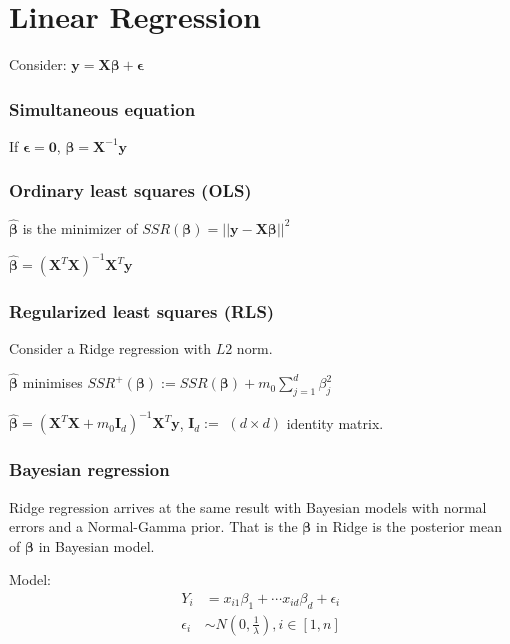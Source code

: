   \section{Linear Regression}

  Consider: $\mathbf{y} = \mathbf{X\beta} + \mathbf{\epsilon}$

  \subsubsection{Simultaneous equation}

  If $\mathbf{\epsilon} = \mathbf{0}$, $\mathbf{\beta} =
  \mathbf{X}^{-1}\mathbf{y}$

  \subsubsection{Ordinary least squares (OLS)}

  $\hat{\mathbf{\beta}}$ is the minimizer of
  $SSR(\mathbf{\beta}) = || \mathbf{y} - \mathbf{X\beta}
  ||^2$

  $\hat{\mathbf{\beta}} =
  (\mathbf{X}^T\mathbf{X})^{-1}\mathbf{X}^T\mathbf{y}$

  \subsubsection{Regularized least squares (RLS)}

  Consider a Ridge regression with $L2$ norm.

  $\hat{\mathbf{\beta}}$ minimises $SSR^+(\mathbf{\beta})
  := SSR(\mathbf{\beta}) + m_0 \sum_{j=1}^d \beta_j^2$

  $\hat{\mathbf{\beta}} = (\mathbf{X}^T\mathbf{X} +
  m_0\mathbf{I}_d)^{-1}\mathbf{X}^T\mathbf{y}$,
  $\mathbf{I}_d :=$ $(d\times d)$ identity matrix.

  \subsubsection{Bayesian regression}

  Ridge regression arrives at the same result with Bayesian
  models with normal errors and a Normal-Gamma prior. That
  is the $\mathbf{\beta}$ in Ridge is the posterior mean of
  $\mathbf{\beta}$ in Bayesian model.

  Model:
  \begin{align*}
      Y_i &=x_{i1}\beta_1 + \cdots x_{id}\beta_d +
      \epsilon_i\\
      \epsilon_i &\sim N\left(0, \frac{1}{\lambda}\right), i \in [1, n]
  \end{align*}


